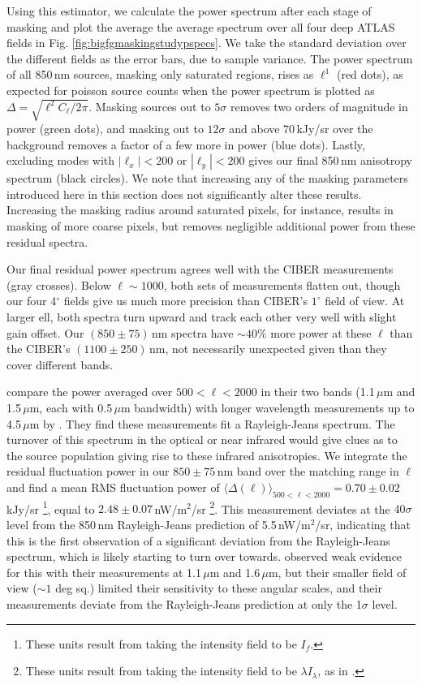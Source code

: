 \documentclass{emulateapj}
\begin{document}
Using this estimator, we calculate the power spectrum after each stage of masking and plot the average the average spectrum over all four deep ATLAS fields in Fig. \ref{fig:bigfgmaskingstudypspecs}. We take the standard deviation over the different fields as the error bars, due to sample variance. The power spectrum of all 850\,nm sources, masking only saturated regions, rises as $\ell^1$ (red dots), as expected for poisson source counts when the power spectrum is plotted as $\Delta=\sqrt{\ell^2C_\ell/2\pi}$. Masking sources out to $5\sigma$ removes two orders of magnitude in power (green dots), and masking out to $12\sigma$ and above 70\,kJy/sr over the background removes a factor of a few more in power (blue dots). Lastly, excluding modes with $|\ell_x|<200$ or $|\ell_y|<200$ gives our final 850\,nm anisotropy spectrum (black circles). We note that increasing any of the masking parameters introduced here in this section does not significantly alter these results. Increasing the masking radius around saturated pixels, for instance, results in masking of more coarse pixels, but removes negligible additional power from these residual spectra. 

Our final residual power spectrum agrees well with the CIBER measurements (gray crosses). Below $\ell\sim1000$, both sets of measurements flatten out, though our  four 4$^\circ$ fields give us much more precision than CIBER's $1^\circ$ field of view. At larger ell, both spectra turn upward  and track each other very well with slight gain offset. Our $(850\pm75)$\,nm spectra have $\sim40\%$ more power at these $\ell$ than the CIBER's $(1100\pm250)$\,nm, not necessarily unexpected given than they cover different bands.

\citet{zemcov14} compare the power averaged over $500<\ell<2000$ in their two bands (1.1\,$\mu$m and 1.5\,$\mu$m, each with 0.5\,$\mu$m bandwidth) with longer wavelength measurements up to 4.5\,$\mu$m by \citet{cooray12,kash3,matsumoto11}. They find these measurements fit a Rayleigh-Jeans spectrum. The turnover of this spectrum in the optical or near infrared would give clues as to the source population giving rise to these infrared anisotropies. We integrate the residual fluctuation power in our $850\pm75$\,nm band over the matching range in $\ell$ and find a mean RMS fluctuation power of $\langle\Delta(\ell)\rangle_{500<\ell<2000}=0.70\pm0.02$\,kJy/sr \footnote{These units result from taking the intensity field to be $I_f$.}, equal to $2.48\pm0.07$\,nW/m$^2$/sr \footnote{These units result from taking the intensity field to be $\lambda I_\lambda$, as in \citet{zemcov14}.}. This measurement deviates at the $40\sigma$ level from the 850\,nm Rayleigh-Jeans prediction of 5.5\,nW/m$^2$/sr, indicating that this is the first observation of a significant deviation from the Rayleigh-Jeans spectrum, which is likely starting to turn over towards. \citet{zemcov14} observed weak evidence for this with their measurements at 1.1\,$\mu$m and 1.6\,$\mu$m, but their smaller field of view ($\sim1$ deg sq.) limited their sensitivity to these angular scales, and their measurements deviate from the Rayleigh-Jeans prediction at only the 1$\sigma$ level. 
\end{document}
